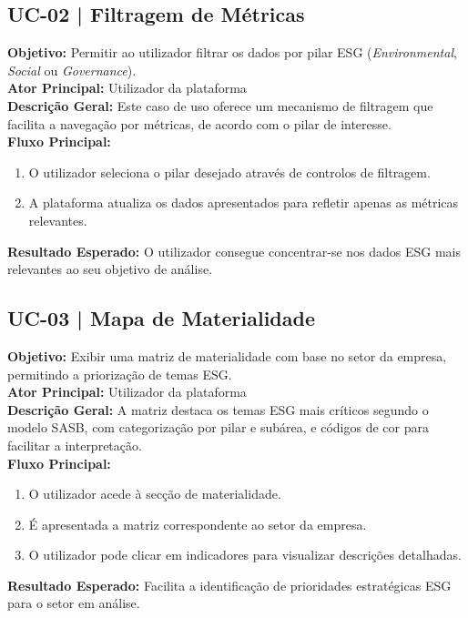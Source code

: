 \subsection{UC-02 | Filtragem de Métricas}

\textbf{Objetivo:} Permitir ao utilizador filtrar os dados por pilar ESG (\textit{Environmental}, \textit{Social} ou \textit{Governance}).\\
\textbf{Ator Principal:} Utilizador da plataforma\\
\textbf{Descrição Geral:} Este caso de uso oferece um mecanismo de filtragem que facilita a navegação por métricas, de acordo com o pilar de interesse.\\
\textbf{Fluxo Principal:}
\begin{enumerate}
    \item O utilizador seleciona o pilar desejado através de controlos de filtragem.
    \item A plataforma atualiza os dados apresentados para refletir apenas as métricas relevantes.
\end{enumerate}
\textbf{Resultado Esperado:} O utilizador consegue concentrar-se nos dados ESG mais relevantes ao seu objetivo de análise.

\subsection{UC-03 | Mapa de Materialidade}

\textbf{Objetivo:} Exibir uma matriz de materialidade com base no setor da empresa, permitindo a priorização de temas ESG.\\
\textbf{Ator Principal:} Utilizador da plataforma\\
\textbf{Descrição Geral:} A matriz destaca os temas ESG mais críticos segundo o modelo SASB, com categorização por pilar e subárea, e códigos de cor para facilitar a interpretação.\\
\textbf{Fluxo Principal:}
\begin{enumerate}
    \item O utilizador acede à secção de materialidade.
    \item É apresentada a matriz correspondente ao setor da empresa.
    \item O utilizador pode clicar em indicadores para visualizar descrições detalhadas.
\end{enumerate}
\textbf{Resultado Esperado:} Facilita a identificação de prioridades estratégicas ESG para o setor em análise.

